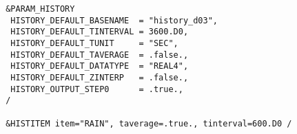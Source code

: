 \vspace{1cm}
\begin{verbatim}
 &PARAM_HISTORY
  HISTORY_DEFAULT_BASENAME  = "history_d03",
  HISTORY_DEFAULT_TINTERVAL = 3600.D0,
  HISTORY_DEFAULT_TUNIT     = "SEC",
  HISTORY_DEFAULT_TAVERAGE  = .false.,
  HISTORY_DEFAULT_DATATYPE  = "REAL4",
  HISTORY_DEFAULT_ZINTERP   = .false.,
  HISTORY_OUTPUT_STEP0      = .true.,
 /

 &HISTITEM item="RAIN", taverage=.true., tinterval=600.D0 /
\end{verbatim}




